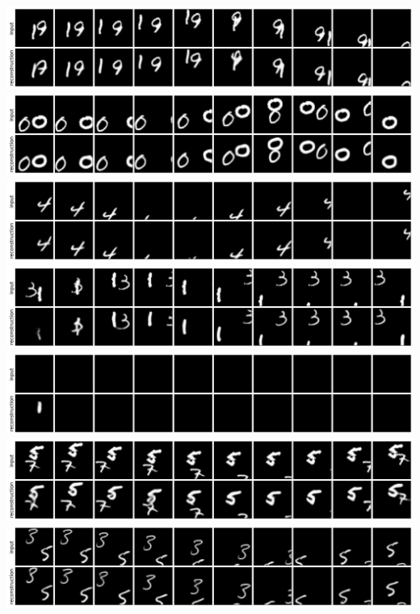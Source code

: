 \begin{center}
    \includegraphics[width=\linewidth]{figures/SQAIR/vrnn_rec/000009.png}
    \includegraphics[width=\linewidth]{figures/SQAIR/vrnn_rec/000015.png}
    \includegraphics[width=\linewidth]{figures/SQAIR/vrnn_rec/000018.png}
    \includegraphics[width=\linewidth]{figures/SQAIR/vrnn_rec/000038.png}
    \includegraphics[width=\linewidth]{figures/SQAIR/vrnn_rec/000041.png}
    \includegraphics[width=\linewidth]{figures/SQAIR/vrnn_rec/000050.png}
    \includegraphics[width=\linewidth]{figures/SQAIR/vrnn_rec/000066.png}
    \label{fig:mnist_recs_vrnn}
\end{center}

